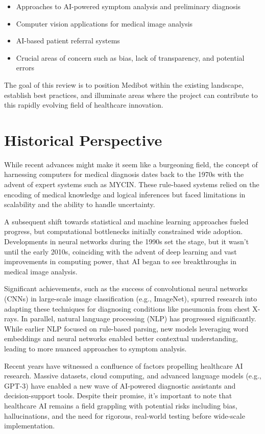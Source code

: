 \begin{itemize}
    \item Approaches to AI-powered symptom analysis and preliminary diagnosis
    \item Computer vision applications for medical image analysis
    \item AI-based patient referral systems
    \item Crucial areas of concern such as bias, lack of transparency, and potential errors
\end{itemize}

The goal of this review is to position Medibot within the existing landscape, establish best practices,  and illuminate areas where the project can contribute to this rapidly evolving field of healthcare innovation.


\section{Historical Perspective}
While recent advances might make it seem like a burgeoning field, the concept of harnessing computers for medical diagnosis dates back to the 1970s with the advent of expert systems such as MYCIN. These rule-based systems relied on the encoding of medical knowledge and logical inferences but faced limitations in scalability and the ability to handle uncertainty.

A subsequent shift towards statistical and machine learning approaches fueled progress, but computational bottlenecks initially constrained wide adoption. Developments in neural networks during the 1990s set the stage, but it wasn't until the early 2010s, coinciding with the advent of deep learning and vast improvements in computing power, that AI began to see breakthroughs in medical image analysis.

Significant achievements, such as the success of convolutional neural networks (CNNs) in large-scale image classification (e.g., ImageNet), spurred research into adapting these techniques for diagnosing conditions like pneumonia from chest X-rays. In parallel, natural language processing (NLP) has progressed significantly.  While earlier NLP focused on rule-based parsing, new models leveraging word embeddings and neural networks enabled better contextual understanding, leading to more nuanced approaches to symptom analysis.

Recent years have witnessed a confluence of factors propelling healthcare AI research.  Massive datasets, cloud computing, and advanced language models (e.g., GPT-3) have enabled a new wave of AI-powered diagnostic assistants and decision-support tools. Despite their promise, it's important to note that healthcare AI remains a field grappling with potential risks including bias, hallucinations, and the need for rigorous, real-world testing before wide-scale implementation.


